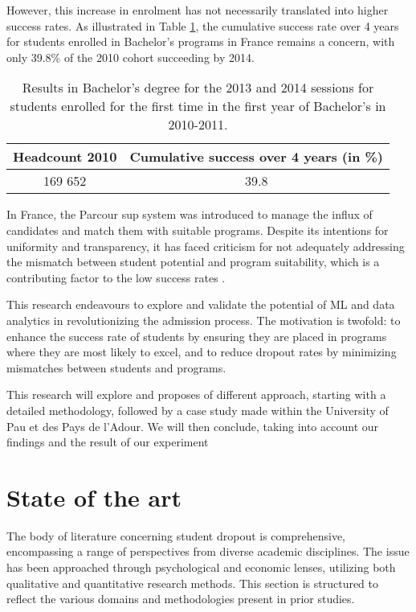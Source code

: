 \documentclass[conference]{IEEEtran}
\begin{document}
However, this increase in enrolment has not necessarily translated into higher success rates. As illustrated in Table \ref{tab:result_bachelor}, the cumulative success rate over 4 years for students enrolled in Bachelor's programs in France remains a concern, with only 39.8\% of the 2010 cohort succeeding by 2014.

\begin{table}[H]
    \centering
    \caption{Results in Bachelor's degree for the 2013 and 2014 sessions for students enrolled for the first time in the first year of Bachelor's in 2010-2011.\cite{kabla-langlois_insee_2016}}
    \begin{tabular}{|c|c|}
        \hline
        \textbf{Headcount 2010} & \textbf{Cumulative success over 4 years (in \%)}\\
        \hline
        169 652 & 39.8 \\
        \hline
    \end{tabular}
    \label{tab:result_bachelor}
\end{table}

In France, the Parcour sup system was introduced to manage the influx of candidates and match them with suitable programs. Despite its intentions for uniformity and transparency, it has faced criticism for not adequately addressing the mismatch between student potential and program suitability, which is a contributing factor to the low success rates \cite{couto_parcoursup_2021}.

This research endeavours to explore and validate the potential of ML and data analytics in revolutionizing the admission process. The motivation is twofold: to enhance the success rate of students by ensuring they are placed in programs where they are most likely to excel, and to reduce dropout rates by minimizing mismatches between students and programs.

This research will explore and proposes of different approach, starting with a detailed methodology, followed by a case study made within the University of Pau et des Pays de l'Adour. 
We will then conclude, taking into account our findings and the result of our experiment 

\section{State of the art}
\label{sec:soa}
The body of literature concerning student dropout is comprehensive, encompassing a range of perspectives from diverse academic disciplines. The issue has been approached through psychological and economic lenses, utilizing both qualitative and quantitative research methods. This section is structured to reflect the various domains and methodologies present in prior studies. 
\end{document}
